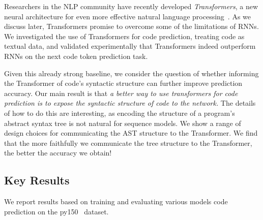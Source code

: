 \documentclass[nonacm, sigconf]{acmart}
\begin{document}
Researchers in the NLP community have recently developed \textit{Transformers}, a new neural architecture for even more effective natural language processing~\cite{vaswani2017attention}.  As we discuss later, Transformers promise to overcome some of the limitations of RNNs.
We investigated the use of Transformers for code prediction, treating code as textual data, and validated experimentally that Transformers indeed outperform RNNs on the next code token prediction task.

Given this already strong baseline, we consider the question of whether informing the Transformer of code's syntactic structure can further improve prediction accuracy.  Our main result is that \textit{a better way to use transformers for code prediction is to expose the syntactic structure of code to the network.} The details of how to do this are interesting, as encoding the structure of a program's abstract syntax tree is not natural for sequence models.  We show a range of design choices for communicating the AST structure to the Transformer. We find that the more faithfully we communicate the tree structure to the Transformer, the better the accuracy we obtain! 

\subsection{Key Results}

We report results based on training and evaluating various models code prediction on the py150~\cite{py150}  dataset. 
\end{document}
